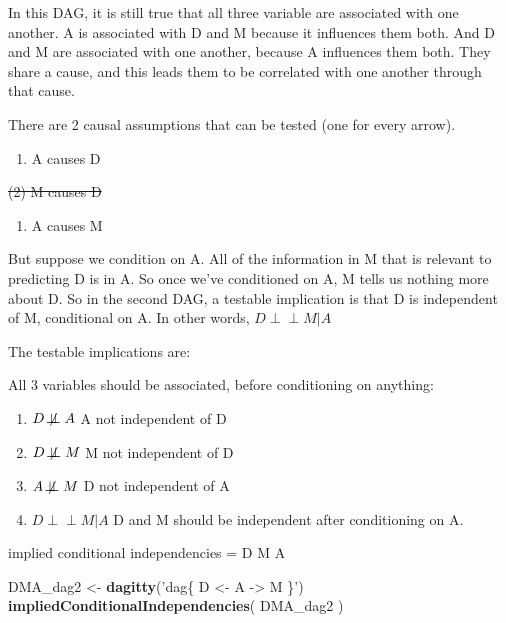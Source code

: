 \documentclass[
]{article}
\newenvironment{Shaded}{\begin{snugshade}}{\end{snugshade}}
\newcommand{\KeywordTok}[1]{\textcolor[rgb]{0.13,0.29,0.53}{\textbf{#1}}}
\newcommand{\NormalTok}[1]{#1}
\newcommand{\StringTok}[1]{\textcolor[rgb]{0.31,0.60,0.02}{#1}}
\providecommand{\tightlist}{%
  \setlength{\itemsep}{0pt}\setlength{\parskip}{0pt}}
\begin{document}
In this DAG, it is still true that all three variable are associated
with one another. A is associated with D and M because it influences
them both. And D and M are associated with one another, because A
influences them both. They share a cause, and this leads them to be
correlated with one another through that cause.

There are 2 causal assumptions that can be tested (one for every arrow).

\begin{enumerate}
\def\labelenumi{(\arabic{enumi})}
\tightlist
\item
  A causes D
\end{enumerate}

\sout{(2) M causes D}

\begin{enumerate}
\def\labelenumi{(\arabic{enumi})}
\setcounter{enumi}{2}
\tightlist
\item
  A causes M
\end{enumerate}

But suppose we condition on A. All of the information in M that is
relevant to predicting D is in A. So once we've conditioned on A, M
tells us nothing more about D. So in the second DAG, a testable
implication is that D is independent of M, conditional on A. In other
words, \(D \!\perp\!\!\!\perp M|A\)

The testable implications are:

All 3 variables should be associated, before conditioning on anything:

\begin{enumerate}
\def\labelenumi{(\arabic{enumi})}
\item
  \(D \not\!\perp\!\!\!\perp A\) A not independent of D
\item
  \(D \not\!\perp\!\!\!\perp M\) M not independent of D
\item
  \(A \not\!\perp\!\!\!\perp M\) D not independent of A
\item
  \(D \!\perp\!\!\!\perp M|A\) D and M should be independent after
  conditioning on A.
\end{enumerate}

implied conditional independencies = D \emph{\textbar\textbar{}} M
\textbar{} A

\begin{Shaded}
\begin{Highlighting}[]
\NormalTok{DMA_dag2 <-}\StringTok{ }\KeywordTok{dagitty}\NormalTok{(}\StringTok{'dag\{ D <- A -> M \}'}\NormalTok{) }
\KeywordTok{impliedConditionalIndependencies}\NormalTok{( DMA_dag2  )}
\end{Highlighting}
\end{Shaded}
\end{document}
